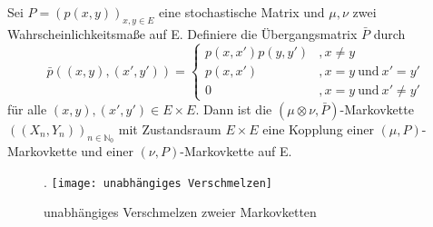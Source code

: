 Sei $P = (p(x,y))_{x,y \in E}$ eine stochastische Matrix und $\mu,\nu$ zwei Wahrscheinlichkeitsmaße auf E. Definiere die Übergangsmatrix $\bar{P}$ durch
\begin{equation*}
\bar{p}((x,y),(x',y'))=
\begin{cases}
p(x,x')p(y,y') & , x \neq y\\
p(x,x') & , x = y \: \mathrm{und} \: x' = y'\\
0 & , x=y \: \mathrm{und} \: x' \neq y'
\end{cases}
\end{equation*}
für alle $(x,y),(x',y') \in E \times E$. Dann ist die $(\mu \otimes \nu,\bar{P})$-Markovkette  $((X_{n},Y_{n}))_{n \in \mathbb{N}_{0}}$ mit Zustandsraum $E \times E$ eine Kopplung einer $(\mu,P)$-Markovkette und einer $(\nu,P)$-Markovkette auf E.
\begin{figure}[H].
\centering
\texttt{[image: unabhängiges Verschmelzen]}
\caption{unabhängiges Verschmelzen zweier Markovketten}
\end{figure}
\noindent